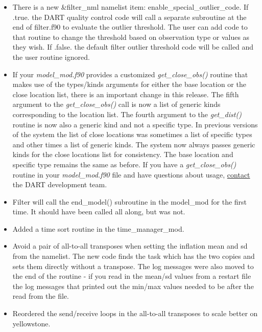 \documentclass[letterpaper,10pt,english]{sphinxmanual}
\begin{document}
\begin{itemize}
\begin{itemize}
\end{itemize}

\item {} 
There is a new \&filter\_nml namelist item:
enable\_special\_outlier\_code. If .true. the DART quality control
code will call a separate subroutine at the end of filter.f90 to
evaluate the outlier threshold. The user can add code to that
routine to change the threshold based on observation type or values
as they wish. If .false. the default filter outlier threshold code
will be called and the user routine ignored.

\item {} 
If your \emph{model\_mod.f90} provides a customized \emph{get\_close\_obs()}
routine that makes use of the types/kinds arguments for either the
base location or the close location list, there is an important
change in this release. The fifth argument to the
\emph{get\_close\_obs()} call is now a list of generic kinds
corresponding to the location list. The fourth argument to the
\emph{get\_dist()} routine is now also a generic kind and not a specific
type. In previous versions of the system the list of close locations
was sometimes a list of specific types and other times a list of
generic kinds. The system now always passes generic kinds for the
close locations list for consistency. The base location and specific
type remains the same as before. If you have a \emph{get\_close\_obs()}
routine in your \emph{model\_mod.f90} file and have questions about
usage, \href{mailto:dart@ucar.edu}{contact} the DART development team.

\item {} 
Filter will call the end\_model() subroutine in the model\_mod for
the first time. It should have been called all along, but was not.

\item {} 
Added a time sort routine in the time\_manager\_mod.

\item {} 
Avoid a pair of all-to-all transposes when setting the inflation
mean and sd from the namelist. The new code finds the task which has
the two copies and sets them directly without a transpose. The log
messages were also moved to the end of the routine - if you read in
the mean/sd values from a restart file the log messages that printed
out the min/max values needed to be after the read from the file.

\item {} 
Reordered the send/receive loops in the all-to-all transposes to
scale better on yellowstone.


\end{itemize}
\end{document}

